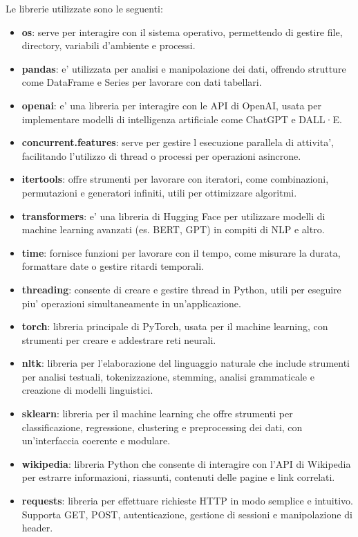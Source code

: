 \documentclass{article}
\begin{document}
\newpage
Le librerie utilizzate sono le seguenti:
\begin{itemize}
	\item \textbf{os}: serve per interagire con il sistema operativo, permettendo di gestire file, directory, variabili d'ambiente e processi.  
	\item \textbf{pandas}: e' utilizzata per analisi e manipolazione dei dati, offrendo strutture come DataFrame e Series per lavorare con dati tabellari.
	\item \textbf{openai}: e' una libreria per interagire con le API di OpenAI, usata per implementare modelli di intelligenza artificiale come ChatGPT e DALL·E.
	\item \textbf{concurrent.features}: serve per gestire l esecuzione parallela di attivita', facilitando l’utilizzo di thread o processi per operazioni asincrone.  
	\item \textbf{itertools}: offre strumenti per lavorare con iteratori, come combinazioni, permutazioni e generatori infiniti, utili per ottimizzare algoritmi.
	\item \textbf{transformers}: e' una libreria di Hugging Face per utilizzare modelli di machine learning avanzati (es. BERT, GPT) in compiti di NLP e altro.
	\item \textbf{time}: fornisce funzioni per lavorare con il tempo, come misurare la durata, formattare date o gestire ritardi temporali.
	\item \textbf{threading}: consente di creare e gestire thread in Python, utili per eseguire piu' operazioni simultaneamente in un'applicazione.\ 
	\item \textbf{torch}: libreria principale di PyTorch, usata per il machine learning, con strumenti per creare e addestrare reti neurali.
	\item \textbf{nltk}: libreria per l'elaborazione del linguaggio naturale che include strumenti per analisi testuali, tokenizzazione, stemming, analisi grammaticale e creazione di modelli linguistici.
	\item \textbf{sklearn}: libreria per il machine learning che offre strumenti per classificazione, regressione, clustering e preprocessing dei dati, con un'interfaccia coerente e modulare.
	\item \textbf{wikipedia}: libreria Python che consente di interagire con l'API di Wikipedia per estrarre informazioni, riassunti, contenuti delle pagine e link correlati.
	\item \textbf{requests}: libreria per effettuare richieste HTTP in modo semplice e intuitivo. Supporta GET, POST, autenticazione, gestione di sessioni e manipolazione di header.

\end{itemize}
\end{document}
